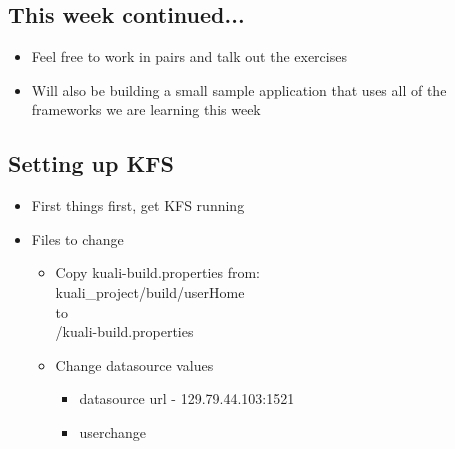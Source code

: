 \documentclass[12pt,notitlepage]{article}
\begin{document}
    \W \begin{s5slide}
        \W \section{This week continued...}
        \begin{ifhtml}
            \begin{itemize}
                \item Feel free to work in pairs and talk out the exercises
                \item Will also be building a small sample application that uses all of the frameworks we are learning this week
            \end{itemize}
        \end{ifhtml} 
    \W \end{s5slide}
    \W \begin{s5slide}
        \W \section{Setting up KFS}
        \begin{ifhtml}
            \begin{itemize}
                \item First things first, get KFS running
                \item Files to change
                \begin{itemize}
                    \item Copy kuali-build.properties from: \\
                    kuali_project/build/userHome  \\
                    to \\
                    [user directory]/kuali-build.properties\\
                    \item Change datasource values
                    	\begin{itemize}
                    		\item datasource url - 129.79.44.103:1521
                    		\item user\pw change
                    	\end{itemize}
                \end{itemize}
            \end{itemize}
        \end{ifhtml} 
    \W \end{s5slide}
\end{document}

